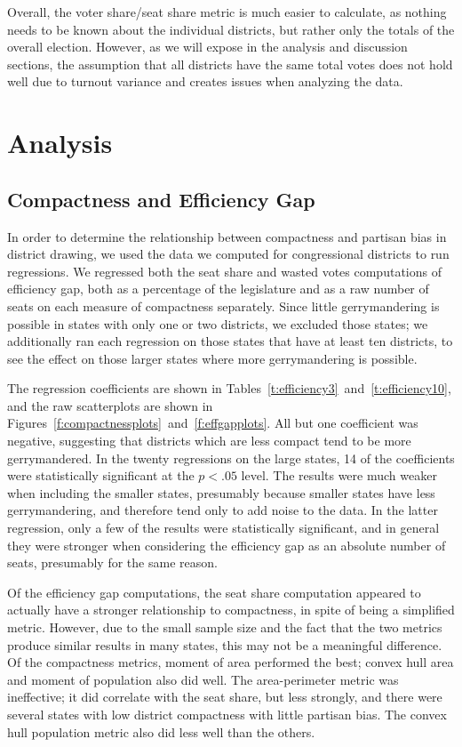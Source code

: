 \documentclass[12pt]{article}
\begin{document}
  Overall, the voter share/seat share metric is much easier to calculate, as nothing needs to be known about the individual districts, but rather only the totals of the overall election.  However, as we will expose in the analysis and discussion sections, the assumption that all districts have the same total votes does not hold well due to turnout variance and creates issues when analyzing the data.


  \section{Analysis}

  \subsection{Compactness and Efficiency Gap}

  In order to determine the relationship between compactness and partisan bias in district drawing, we used the data we computed for congressional districts to run regressions.  We regressed both the seat share and wasted votes computations of efficiency gap, both as a percentage of the legislature and as a raw number of seats on each measure of compactness separately.  Since little gerrymandering is possible in states with only one or two districts, we excluded those states; we additionally ran each regression on those states that have at least ten districts, to see the effect on those larger states where more gerrymandering is possible.

  The regression coefficients are shown in Tables~\ref{t:efficiency3}~and~\ref{t:efficiency10}, and the raw scatterplots are shown in Figures~\ref{f:compactnessplots}~and~\ref{f:effgapplots}.  All but one coefficient was negative, suggesting that districts which are less compact tend to be more gerrymandered.  In the twenty regressions on the large states, 14 of the coefficients were statistically significant at the $p<.05$ level.  The results were much weaker when including the smaller states, presumably because smaller states have less gerrymandering, and therefore tend only to add noise to the data.  In the latter regression, only a few of the results were statistically significant, and in general they were stronger when considering the efficiency gap as an absolute number of seats, presumably for the same reason.

  Of the efficiency gap computations, the seat share computation appeared to actually have a stronger relationship to compactness, in spite of being a simplified metric.  However, due to the small sample size and the fact that the two metrics produce similar results in many states, this may not be a meaningful difference.  Of the compactness metrics, moment of area performed the best; convex hull area and moment of population also did well.  The area-perimeter metric was ineffective; it did correlate with the seat share, but less strongly, and there were several states with low district compactness with little partisan bias.  The convex hull population metric also did less well than the others.
\end{document}
